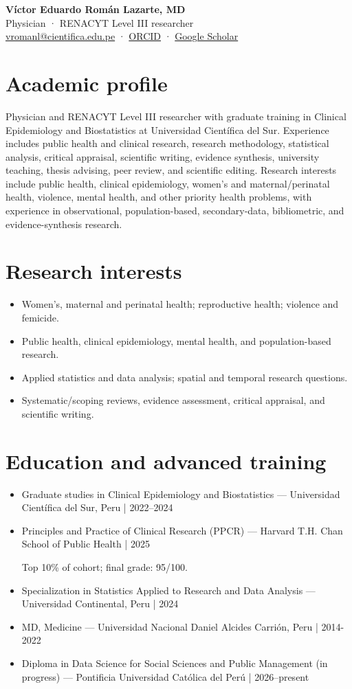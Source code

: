 \documentclass[11pt,a4paper]{article}
\begin{document}
{\LARGE\bfseries Víctor Eduardo Román Lazarte, MD}\\[5pt]
Physician · RENACYT Level III researcher\\
\href{mailto:vromanl@cientifica.edu.pe}{vromanl@cientifica.edu.pe} · \href{https://orcid.org/0000-0001-9664-5169}{ORCID} · \href{https://scholar.google.com/citations?user=KxjvJJEAAAAJ}{Google Scholar}
\section*{Academic profile}
Physician and RENACYT Level III researcher with graduate training in Clinical Epidemiology and Biostatistics at Universidad Científica del Sur. Experience includes public health and clinical research, research methodology, statistical analysis, critical appraisal, scientific writing, evidence synthesis, university teaching, thesis advising, peer review, and scientific editing. Research interests include public health, clinical epidemiology, women's and maternal/perinatal health, violence, mental health, and other priority health problems, with experience in observational, population-based, secondary-data, bibliometric, and evidence-synthesis research.
\section*{Research interests}
\begin{itemize}[leftmargin=*,itemsep=4pt]
\item Women's, maternal and perinatal health; reproductive health; violence and femicide.
\item Public health, clinical epidemiology, mental health, and population-based research.
\item Applied statistics and data analysis; spatial and temporal research questions.
\item Systematic/scoping reviews, evidence assessment, critical appraisal, and scientific writing.
\end{itemize}
\section*{Education and advanced training}
\begin{itemize}[leftmargin=*,itemsep=4pt]
\item Graduate studies in Clinical Epidemiology and Biostatistics — Universidad Científica del Sur, Peru | 2022–2024
\item Principles and Practice of Clinical Research (PPCR) — Harvard T.H. Chan School of Public Health | 2025
\par {\small Top 10\% of cohort; final grade: 95/100.}
\item Specialization in Statistics Applied to Research and Data Analysis — Universidad Continental, Peru | 2024
\item MD, Medicine — Universidad Nacional Daniel Alcides Carrión, Peru | 2014-2022
\item Diploma in Data Science for Social Sciences and Public Management (in progress) — Pontificia Universidad Católica del Perú | 2026–present
\end{itemize}
\end{document}
